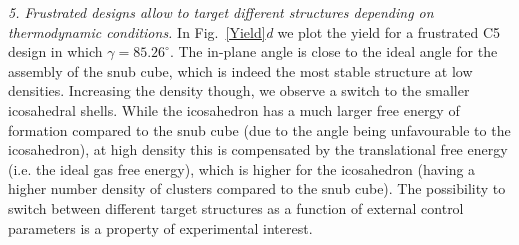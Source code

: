 \documentclass[a4paper, amsfonts, amssymb, amsmath, reprint, showkeys, nofootinbib, twoside]{revtex4-1}
\begin{document}

\noindent
\emph{5. Frustrated designs allow to target different structures depending on thermodynamic conditions.} In Fig.~\ref{Yield}\textit{d}  we plot the yield for a frustrated C5 design in which $\gamma=85.26^\circ$. The in-plane angle is close to the ideal angle for the assembly of the snub cube, which is indeed the most stable structure at low densities. Increasing the density though, we observe a switch to the smaller icosahedral shells. While the icosahedron has a much larger free energy of formation compared to the snub cube (due to the angle being unfavourable to the icosahedron), at high density this is compensated by the translational free energy (i.e. the ideal gas free energy), which is higher for the icosahedron (having a higher number density of clusters compared to the snub cube). The possibility to switch between different target structures as a function of external control parameters is a property of experimental interest.
\end{document}
